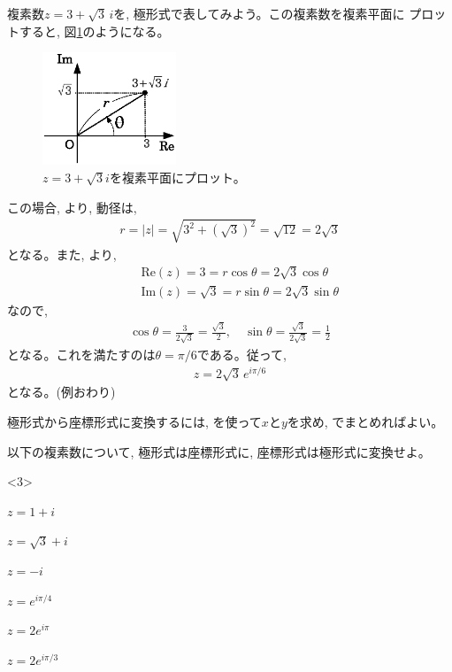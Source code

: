 \begin{exmpl} 複素数$z=3+\sqrt{3}\,i$を, 極形式で表してみよう。この複素数を複素平面に
プロットすると, 図\ref{fig:cplane_exm}のようになる。
\begin{figure}[h]
    \centering
    \includegraphics[width=4cm]{cplane_exm.eps}
    \caption{$z=3+\sqrt{3}i$を複素平面にプロット。}\label{fig:cplane_exm}
\end{figure}
この場合, より, 動径は, 
\begin{eqnarray}r=|z|=\sqrt{3^2+(\sqrt{3})^2}=\sqrt{12}=2\sqrt{3}\end{eqnarray}
となる。また, より, 
\begin{eqnarray*}
&&\text{Re}(z)=3=r \cos \theta = 2\sqrt{3}\cos\theta\\
&&\text{Im}(z)=\sqrt{3}=r \sin \theta = 2\sqrt{3}\sin \theta
\end{eqnarray*}
なので, 
\begin{eqnarray}
\cos\theta=\frac{3}{2\sqrt{3}}=\frac{\sqrt{3}}{2},\quad
\sin\theta=\frac{\sqrt{3}}{2\sqrt{3}}=\frac{1}{2}
\end{eqnarray}
となる。これを満たすのは$\theta=\pi/6$である。従って, 
\begin{eqnarray}
z=2\sqrt{3}\,e^{i\pi/6}
\end{eqnarray}
となる。(例おわり)
\end{exmpl}
\hv

極形式から座標形式に変換するには, を使って$x$と$y$を求め, でまとめればよい。\\

\begin{q}\label{q:univ_comp_polar0} 以下の複素数について, 極形式は座標形式に, 座標形式は極形式に変換せよ。
\begin{edaenumerate}<3>
\item $z=1+i$
\item $z=\sqrt{3}+i$
\item $z=-i$
\item $z=e^{i\pi/4}$
\item $z=2e^{i\pi}$
\item $z=2 e^{i\pi/3}$
\end{edaenumerate}\end{q}
\vspace{0.3cm}

